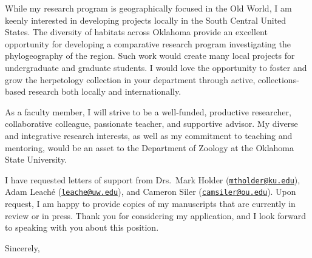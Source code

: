 \documentclass[letterpaper, 10pt]{letter}
\begin{document}
\begin{letter}


While my research program is geographically focused in the Old World, I am
keenly interested in developing projects locally in the South Central
United States.
The diversity of habitats across Oklahoma provide an excellent opportunity
for developing a comparative research program investigating the
phylogeography of the region.
Such work would create many local projects for undergraduate and graduate
students.
I would love the opportunity to foster and grow the herpetology collection
in your department through active, collections-based research both locally
and internationally.


As a faculty member, I will strive to be a well-funded, productive researcher,
collaborative colleague, passionate teacher, and supportive advisor.
My diverse and integrative research interests, as well as my commitment to
teaching and mentoring, would be an asset to the Department of Zoology at the
Oklahoma State University.

I have requested letters of support from Drs.\
Mark Holder
(\href{mailto:mtholder@ku.edu}{\tt mtholder@ku.edu}),
Adam Leach\'{e}
(\href{mailto:leache@uw.edu}{\tt leache@uw.edu}),
and
Cameron Siler
(\href{mailto:camsiler@ou.edu}{\tt camsiler@ou.edu}).
Upon request, I am happy to provide copies of my manuscripts that are currently
in review or in press.
Thank you for considering my application, and I look forward to speaking with
you about this position.

\addtolength{\medskipamount}{-5pt}
\closing{Sincerely,}
\end{letter}
\end{document}
